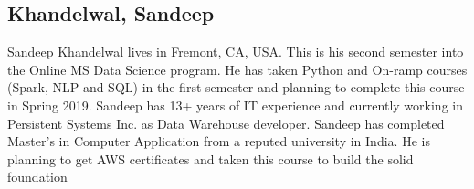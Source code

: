 \subsection{Khandelwal, Sandeep}

Sandeep Khandelwal lives in Fremont, CA, USA. This is his second
semester into the Online MS Data Science program. He has taken Python
and On-ramp courses (Spark, NLP and SQL) in the first semester and
planning to complete this course in Spring 2019. Sandeep has 13+ years
of IT experience and currently working in Persistent Systems Inc. as
Data Warehouse developer. Sandeep has completed Master's in Computer
Application from a reputed university in India. He is planning to get
AWS certificates and taken this course to build the solid foundation

